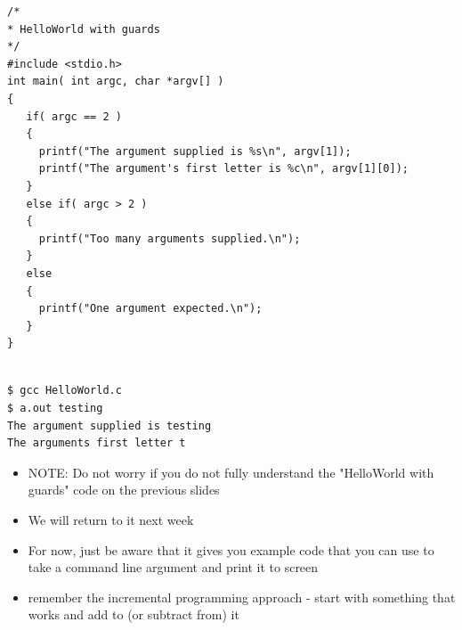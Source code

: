 \documentclass{beamer}
\begin{document}
\begin{frame}[fragile]
\begin{block}{}
\begin{lstlisting}
/*
* HelloWorld with guards
*/
#include <stdio.h>
int main( int argc, char *argv[] )  
{
   if( argc == 2 )
   {
     printf("The argument supplied is %s\n", argv[1]);
     printf("The argument's first letter is %c\n", argv[1][0]);
   }
   else if( argc > 2 )
   {
     printf("Too many arguments supplied.\n");
   }
   else
   {
     printf("One argument expected.\n");
   }
}
\end{lstlisting}
\end{block}
\end{frame}


\begin{frame}[fragile]
\begin{block}{}
\begin{lstlisting}

$ gcc HelloWorld.c
$ a.out testing
The argument supplied is testing
The arguments first letter t

\end{lstlisting}
\end{block}
\end{frame}

\begin{frame}
\begin{itemize}
\item NOTE: Do not worry if you do not fully understand the "HelloWorld with guards" code on the previous slides
\item We will return to it next week
\item For now, just be aware that it gives you example code that you can use to take a command line argument and print it to screen
\item remember the incremental programming approach - start with something that works and add to (or subtract from) it
\end{itemize}
\end{frame}
\end{document}
